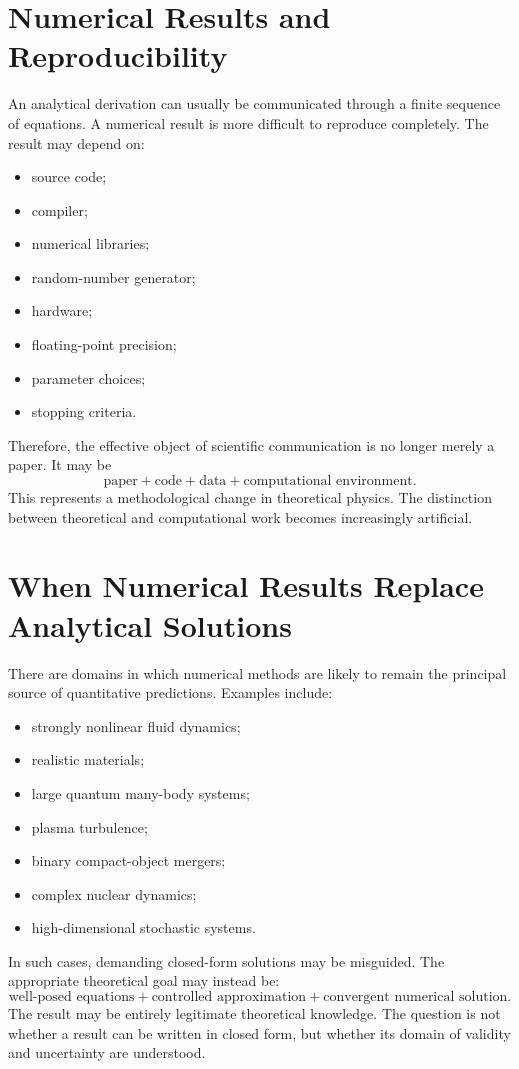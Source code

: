 \section{ Numerical Results and Reproducibility}
An analytical derivation can usually be communicated through a finite sequence
of equations.
A numerical result is more difficult to reproduce completely.
The result may depend on:
\begin{itemize}
\item source code;
\item compiler;
\item numerical libraries;
\item random-number generator;
\item hardware;
\item floating-point precision;
\item parameter choices;
\item stopping criteria.
\end{itemize}
Therefore, the effective object of scientific communication is no longer merely
a paper. It may be
\[\boxed{\text{paper}+\text{code}+\text{data}+\text{computational environment}.}\]
This represents a methodological change in theoretical physics.
The distinction between theoretical and computational work becomes increasingly artificial.

\section{ When Numerical Results Replace Analytical Solutions}
There are domains in which numerical methods are likely to remain the principal
source of quantitative predictions.
Examples include:
\begin{itemize}
\item strongly nonlinear fluid dynamics;
\item realistic materials;
\item large quantum many-body systems;
\item plasma turbulence;
\item binary compact-object mergers;
\item complex nuclear dynamics;
\item high-dimensional stochastic systems.
\end{itemize}
In such cases, demanding closed-form solutions may be misguided.
The appropriate theoretical goal may instead be:
\[\text{well-posed equations}+\text{controlled approximation}+
\text{convergent numerical solution}.\]
The result may be entirely legitimate theoretical knowledge.
The question is not whether a result can be written in closed form, but whether
its domain of validity and uncertainty are understood.

